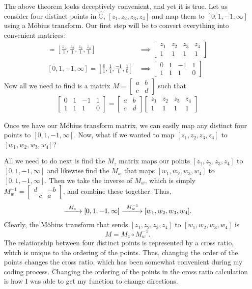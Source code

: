 \documentclass[12pt,a4paper,reqno,parskip=full]{amsart}
\numberwithin{equation}{section}
\theoremstyle{plain}
\theoremstyle{definition}
\def\C{{\mathbb C}}
\begin{document}
The above theorem looks deceptively convenient, and yet it is true. Let us consider four distinct points in $\hat\C$, $[z_1,z_2,z_3,z_4]$ and map them to $[0,1,-1,\infty]$ using a Möbius transform. Our first step will be to convert everything into convenient matrices:
\begin{align*}
[z_1,z_2,z_3,z_4]=\left[\frac{z_1}{1},\frac{z_2}{1},\frac{z_3}{1},\frac{z_4}{1}\right]
&\implies
\begin{bmatrix}z_1 & z_2 & z_3 & z_4 \\ 1 & 1 & 1 & 1\end{bmatrix}\\
[0,1,-1,\infty]=\left[\frac{0}{1},\frac{1}{1},\frac{-1}{1},\frac{1}{0}\right]
&\implies
\begin{bmatrix}0 & 1 & -1 & 1\\ 1 & 1 & 1 & 0\end{bmatrix}
\end{align*}
Now all we need to find is a matrix $M=\begin{bmatrix}a&b\\c&d\end{bmatrix}$ such that
\begin{align*}
\begin{bmatrix}0 & 1 & -1 & 1\\ 1 & 1 & 1 & 0\end{bmatrix}=
\begin{bmatrix}a&b\\c&d\end{bmatrix}
\begin{bmatrix}z_1 & z_2 & z_3 & z_4 \\ 1 & 1 & 1 & 1\end{bmatrix}
\end{align*}

Once we have our Möbius transform matrix, we can easily map any distinct four points to $[0,1,-1,\infty]$. Now, what if we wanted to map $[z_1,z_2,z_3,z_4]$ to $[w_1,w_2,w_3,w_4]$?

All we need to do next is find the $M_z$ matrix maps our points $[z_1,z_2,z_3,z_4]$ to $[0,1,-1,\infty]$ and likewise find the $M_w$ that maps $[w_1,w_2,w_3,w_4]$ to $[0,1,-1,\infty]$. Then we take the inverse of $M_w$, which is simply $M_w^{-1}=\left[\begin{smallmatrix}d&-b\\-c&a\end{smallmatrix}\right]$, and combine these together. Thus,
\begin{align*}
[z_1,z_2,z_3,z_4]\xrightarrow{\text{\;\;$M_z$\;\;}}[0,1,-1,\infty]\xrightarrow{\text{\;\;$M_w^{-1}$\;}}[w_1,w_2,w_3,w_4].
\end{align*}
 Clearly, the Möbius transform that sends $[z_1,z_2,z_3,z_4]$ to $[w_1,w_2,w_3,w_4]$ is
\[M=M_z\circ M_w^{-1}.\]
The relationship between four distinct points is represented by a cross ratio, which is unique to the ordering of the points. Thus, changing the order of the points changes the cross ratio, which has been somewhat convenient during my coding process. Changing the ordering of the points in the cross ratio calculation is how I was able to get my function to change directions.
\end{document}
